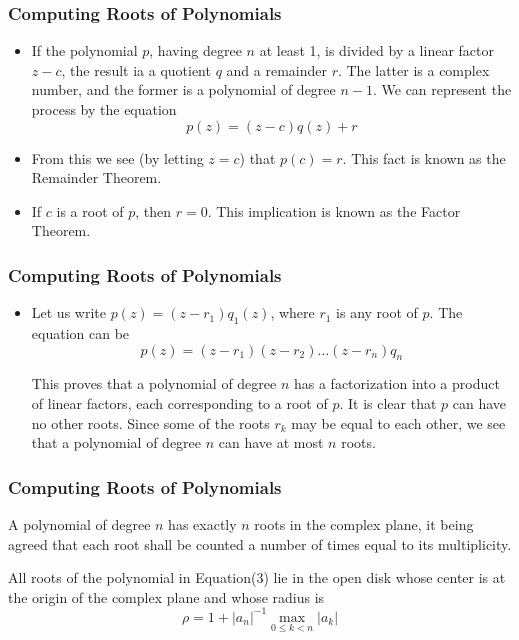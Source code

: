 \documentclass[notheorems,mathserif,table,compress]{beamer}  %
\begin{document}
\begin{frame}
\frametitle{Computing Roots of Polynomials}
\begin{itemize}
\item If the polynomial $p$, having degree $n$ at least 1, is divided by a linear factor $z-c$, the result ia a quotient $q$ and a remainder $r$. The latter is a complex number, and the former is a polynomial of degree $n-1$. We can represent the process by the equation
\begin{displaymath}
p(z)=(z-c)q(z)+r 
\end{displaymath}

\end{itemize}
\begin{itemize}
\item From this we see (by letting $z=c$) that $p(c)=r$. This fact is known as the \textsf{Remainder Theorem}. 
\end{itemize}
\begin{itemize}
\item If $c$ is a root of $p$, then $r=0$. This implication is known as the \textsf{Factor Theorem}. 
\end{itemize}
\end{frame}

\begin{frame}
\frametitle{Computing Roots of Polynomials}
\begin{itemize}
\item Let us write $p(z)=(z-r_1)q_1(z)$, where $r_1$ is any root of $p$. The equation can be
\begin{displaymath}
p(z)=(z-r_1)(z-r_2)\ldots(z-r_n)q_n
\end{displaymath}

This proves that a polynomial of degree $n$ has a factorization into a product of linear factors, each corresponding to a root of $p$. It is clear that $p$ can have no other roots. Since some of the roots $r_k$ may be equal to each other, we see that a polynomial of degree $n$ can have at most $n$ roots.
\end{itemize}
\end{frame}

\begin{frame}
\frametitle{Computing Roots of Polynomials}
\begin{theorem}
A polynomial of degree $n$ has exactly $n$ roots in the complex plane, it being agreed that each root shall be counted a number of times equal to its multiplicity.
\end{theorem}

\begin{theorem}
All roots of the polynomial in Equation(3) lie in the open disk whose center is at the origin of the complex plane and whose radius is
\begin{displaymath}
\rho=1+|a_n|^{-1}\max_{0\leq k<n}|a_k|
\end{displaymath}

\end{theorem}
\end{frame}
\end{document}
